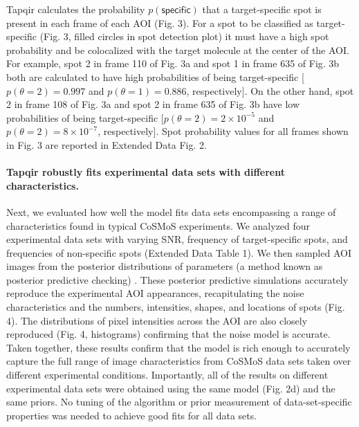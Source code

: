 Tapqir calculates the probability $p(\mathsf{specific})$ that a target-specific spot is present in each frame of each AOI (Fig. 3).  For a spot to be classified as target-specific (Fig. 3, filled circles in spot detection plot) it must have a high spot probability and be colocalized with the target molecule at the center of the AOI. For example, spot 2 in frame 110 of Fig. 3a and spot 1 in frame 635 of Fig. 3b both are calculated to have high probabilities of being target-specific [$p(\theta=2) = 0.997$ and $p(\theta=1) = 0.886$, respectively]. On the other hand, spot 2 in frame 108 of Fig. 3a and spot 2 in frame 635 of Fig. 3b have low probabilities of being target-specific [$p(\theta=2) = 2 \times 10^{-5}$ and $p(\theta=2) = 8 \times 10^{-7}$, respectively]. Spot probability values for all frames shown in Fig. 3 are reported in Extended Data Fig. 2.  

\paragraph{Tapqir robustly fits experimental data sets with different characteristics.}
Next, we evaluated how well the model fits data sets encompassing a range of characteristics found in typical CoSMoS experiments. We analyzed four experimental data sets with varying SNR, frequency of target-specific spots, and frequencies of non-specific spots (Extended Data Table 1). We then sampled AOI images from the posterior distributions of parameters (a method known as posterior predictive checking) \cite{Gelman_undated-ro}. These posterior predictive simulations accurately reproduce the experimental AOI appearances, recapitulating the noise characteristics and the numbers, intensities, shapes, and locations of spots (Fig. 4).  The distributions of pixel intensities across the AOI are also closely reproduced (Fig. 4, histograms) confirming that the noise model is accurate. Taken together, these results confirm that the model is rich enough to accurately capture the full range of image characteristics from CoSMoS data sets taken over different experimental conditions.  Importantly, all of the results on different experimental data sets were obtained using the same model (Fig. 2d) and the same priors.  No tuning of the algorithm or prior measurement of data-set-specific properties was needed to achieve good fits for all data sets.

